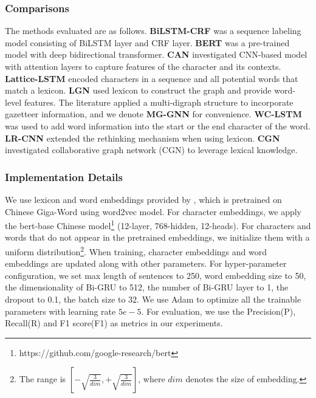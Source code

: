 \documentclass[conference]{IEEEtran}
\begin{document}
    
\subsubsection{Comparisons} 
The methods evaluated are as follows.
\textbf{BiLSTM-CRF} \cite{huang2015bidirectional}  was a sequence labeling model consisting of BiLSTM layer and CRF layer.
\textbf{BERT} \cite{devlin-etal-2019-bert} was a pre-trained model with deep bidirectional transformer.
    \textbf{CAN} \cite{zhu2019can} investigated CNN-based model with attention layers to capture features of the character and its contexts.
\textbf{Lattice-LSTM} \cite{zhang2018chinese} encoded characters in a sequence and all potential words that match a lexicon.
\textbf{LGN} \cite{gui2019lexicon} used lexicon to construct the graph and provide word-level features.
The literature \cite{ding2019neural} applied a multi-digraph structure to incorporate gazetteer information, and we denote \textbf{MG-GNN} for convenience. 
\textbf{WC-LSTM} \cite{liu2019encoding} was used to add word information into the start or the end character of the word. 
\textbf{LR-CNN} \cite{gui2019cnn}  extended the rethinking mechanism when using lexicon.
\textbf{CGN} \cite{sui2019leverage} investigated collaborative graph network (CGN) to leverage lexical knowledge.


        
\subsubsection{Implementation Details}
We use lexicon and word embeddings provided by \cite{li-etal-2018-analogical},
which is pretrained on Chinese Giga-Word 
using word2vec model. 
For character embeddings, we apply the {bert{-}base Chinese} model\footnote{https://github.com/google-research/bert} 
(12-layer, 768-hidden, 12-heads). 
For characters and words that do not appear in the pretrained embeddings, we initialize them with a uniform distribution\footnote{The range is $[-\sqrt{\frac{3}{dim}}, +\sqrt{\frac{3}{dim}}]$, where $dim$ denotes
the size of embedding.}.
When training, character embeddings and word embeddings are updated along with other parameters.
For hyper-parameter configuration, 
we set max length of sentences to 250, word embedding size to 50, 
the dimensionality of Bi-GRU to 512, the number of Bi-GRU layer to 1, 
the dropout to 0.1,
the batch size to 32.
We use Adam to optimize all the trainable parameters with learning rate $5e-5$. For evaluation,  we use the Precision(P), Recall(R) and F1 score(F1) as metrics in our experiments.
\end{document}
